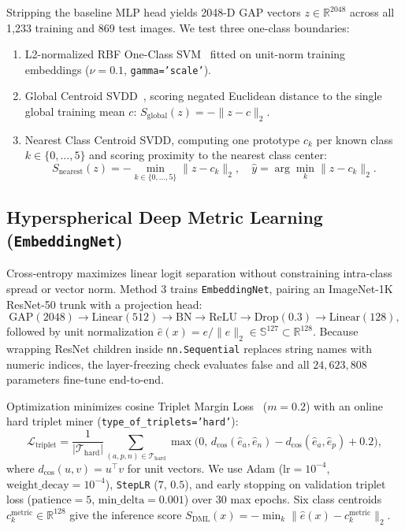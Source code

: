 \documentclass[conference]{IEEEtran}
\begin{document}
Stripping the baseline MLP head yields 2048-D GAP vectors $z \in \mathbb{R}^{2048}$ across all 1,233 training and 869 test images. We test three one-class boundaries:
\begin{enumerate}
    \item L2-normalized RBF One-Class SVM~\cite{scholkopf_2001_ocsvm} fitted on unit-norm training embeddings ($\nu = 0.1$, \texttt{gamma='scale'}).
    \item Global Centroid SVDD~\cite{tax_2004_svdd}, scoring negated Euclidean distance to the single global training mean $c$: $S_{\mathrm{global}}(z) = -\|z - c\|_2$.
    \item Nearest Class Centroid SVDD, computing one prototype $c_k$ per known class $k \in \{0,\dots,5\}$ and scoring proximity to the nearest class center:
    \begin{equation}
    S_{\mathrm{nearest}}(z) = -\min_{k \in \{0,\dots,5\}} \|z - c_k\|_2, \quad \hat{y} = \arg\min_{k} \|z - c_k\|_2.
    \end{equation}
\end{enumerate}

\subsection{Hyperspherical Deep Metric Learning (\texttt{EmbeddingNet})}
\label{sec:dml}

Cross-entropy maximizes linear logit separation without constraining intra-class spread or vector norm. Method 3 trains \texttt{EmbeddingNet}, pairing an ImageNet-1K ResNet-50 trunk with a projection head:
\begin{equation}
\mathrm{GAP}(2048) \to \mathrm{Linear}(512) \to \mathrm{BN} \to \mathrm{ReLU} \to \mathrm{Drop}(0.3) \to \mathrm{Linear}(128),
\end{equation}
followed by unit normalization $\hat{e}(x) = e / \|e\|_2 \in \mathbb{S}^{127} \subset \mathbb{R}^{128}$. Because wrapping ResNet children inside \texttt{nn.Sequential} replaces string names with numeric indices, the layer-freezing check evaluates false and all $24,623,808$ parameters fine-tune end-to-end.

Optimization minimizes cosine Triplet Margin Loss~\cite{schroff_2015_facenet,musgrave_2020_pml} ($m = 0.2$) with an online hard triplet miner (\texttt{type\_of\_triplets='hard'}):
\begin{equation}
\mathcal{L}_{\mathrm{triplet}} = \frac{1}{|\mathcal{T}_{\mathrm{hard}}|} \sum_{(a,p,n) \in \mathcal{T}_{\mathrm{hard}}} \max\bigl(0,\, d_{\cos}(\hat{e}_a, \hat{e}_n) - d_{\cos}(\hat{e}_a, \hat{e}_p) + 0.2\bigr),
\end{equation}
where $d_{\cos}(u, v) = u^\top v$ for unit vectors. We use Adam ($\text{lr}=10^{-4}$, $\text{weight\_decay}=10^{-4}$), \texttt{StepLR} ($7$, $0.5$), and early stopping on validation triplet loss ($\text{patience}=5$, $\text{min\_delta}=0.001$) over $30$ max epochs. Six class centroids $c_k^{\mathrm{metric}} \in \mathbb{R}^{128}$ give the inference score $S_{\mathrm{DML}}(x) = -\min_k \|\hat{e}(x) - c_k^{\mathrm{metric}}\|_2$.
\end{document}
